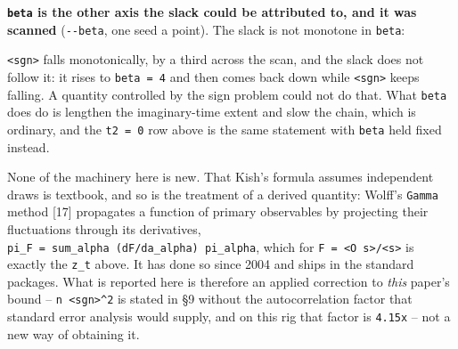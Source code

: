\documentclass[10pt,letterpaper,twocolumn]{article}
\begin{document}
\textbf{\texttt{beta} is the other axis the slack could be attributed to, and it was scanned} (\texttt{-{}\allowbreak{}-{}\allowbreak{}beta}, one
seed a point). The slack is not monotone in \texttt{beta}:


\texttt{\textless{}\allowbreak{}sgn\textgreater{}\allowbreak{}} falls monotonically, by a third across the scan, and the slack does not follow it: it rises
to \texttt{beta\ =\allowbreak{}\ 4} and then comes back down while \texttt{\textless{}\allowbreak{}sgn\textgreater{}\allowbreak{}} keeps falling. A quantity controlled by the
sign problem could not do that. What \texttt{beta} does do is lengthen the imaginary-time extent and slow
the chain, which is ordinary, and the \texttt{t2\ =\allowbreak{}\ 0} row above is the same statement with \texttt{beta} held
fixed instead.

None of the machinery here is new. That Kish's
formula assumes independent draws is textbook, and so is the treatment of a derived quantity:
Wolff's \texttt{Gamma} method {[}17{]} propagates a function of primary observables by projecting their
fluctuations through its derivatives, \texttt{pi\_\allowbreak{}F\ =\allowbreak{}\ sum\_\allowbreak{}alpha\ (\allowbreak{}dF/\allowbreak{}da\_\allowbreak{}alpha)\allowbreak{}\ pi\_\allowbreak{}alpha}, which for
\texttt{F\ =\allowbreak{}\ \textless{}\allowbreak{}O\ s\textgreater{}\allowbreak{}/\allowbreak{}\textless{}\allowbreak{}s\textgreater{}\allowbreak{}} is exactly the \texttt{z\_\allowbreak{}t} above. It has done so since 2004 and ships in the standard
packages. What is reported here is therefore an applied correction to \emph{this} paper's bound --
\texttt{n\ \textless{}\allowbreak{}sgn\textgreater{}\allowbreak{}\^{}2} is stated in §9 without the autocorrelation factor that standard error analysis would
supply, and on this rig that factor is \texttt{4.\allowbreak{}15x} -- not a new way of obtaining it.
\end{document}
